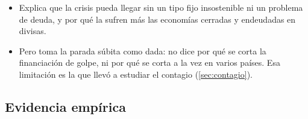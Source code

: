 \documentclass[11pt]{article}
\begin{document}
\begin{itemize}
\item Explica que la crisis pueda llegar sin un tipo fijo insostenible ni un problema de deuda, y por qué la sufren más las economías cerradas y endeudadas en divisas.
\item Pero toma la parada súbita como dada: no dice por qué se corta la financiación de golpe, ni por qué se corta a la vez en varios países. Esa limitación es la que llevó a estudiar el contagio (\ref{sec:contagio}).
\end{itemize}

\subsection{Evidencia empírica}\label{sec:tercera-evidencia}
\end{document}

